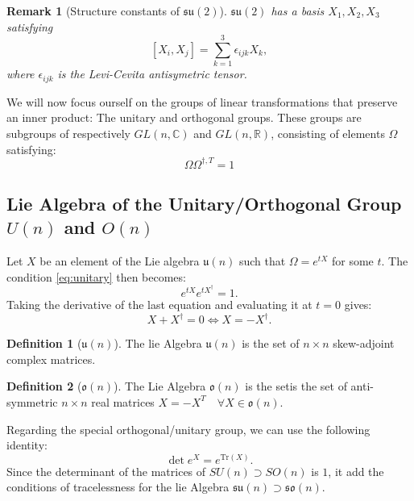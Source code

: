 \documentclass[11pt,a4paper]{article}
\newtheorem*{remark}{Remark}
\theoremstyle{definition}
\newtheorem{definition}{Definition}[section]
\numberwithin{equation}{section}
\begin{document}
\begin{remark}[Structure constants of $\mathfrak{su}(2)$]
    $\mathfrak{su}(2)$ has a basis $X_1,X_2,X_3$ satisfying
    \begin{equation*}
        \left[X_i,X_j\right] = \sum_{k=1}^{3}\epsilon_{ijk}X_k,
    \end{equation*}
    where $\epsilon_{ijk}$ is the Levi-Cevita antisymetric tensor.
\end{remark}
We will now focus ourself on the groups of linear transformations that preserve an inner product: The unitary and orthogonal groups. These groups are subgroups of respectively $GL(n,\mathbb{C})$ and $GL(n,\mathbb{R})$, consisting of elements $\Omega$ satisfying:
\begin{equation}
    \label{eq:unitary}
    \Omega\Omega^{\dagger,T} = 1
\end{equation}
\subsection{Lie Algebra of the Unitary/Orthogonal Group $U(n)$ and $ O(n)$}
Let $X$ be an element of the Lie algebra $\mathfrak{u}(n)$ such that $\Omega = e^{tX}$ for some $t$.
The condition \ref{eq:unitary} then becomes:
\begin{equation*}
    e^{tX}e^{tX^\dagger} = 1.
\end{equation*}
Taking the derivative of the last equation and evaluating it at $t=0$ gives:
\begin{equation*}
    X + X^\dagger = 0 \Leftrightarrow X = -X^\dagger.
\end{equation*}
\begin{definition}[$\mathfrak{u}(n)$]
    The lie Algebra $\mathfrak{u}(n)$ is the set of $n\times n$ skew-adjoint complex matrices.
\end{definition}

\begin{definition}[$\mathfrak{o}(n)$]
    The Lie Algebra $\mathfrak{o}(n)$ is the setis the set of  anti-symmetric $n\times n$ real matrices $X = - X^T \quad \forall X \in \mathfrak{o}(n)$.
\end{definition}
Regarding the special orthogonal/unitary group, we can use the following identity:
\begin{equation*}
    \det e^{X} = e^{\text{Tr}(X)}.
\end{equation*}
Since the determinant of the matrices of $SU(n)\supset SO(n)$ is $1$, it add the conditions of tracelessness for the lie Algebra  $\mathfrak{su}(n) \supset \mathfrak{so}(n)$.
\end{document}
